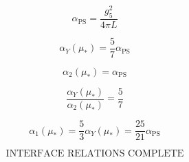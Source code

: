 \documentclass[11pt,a4paper]{article}
\theoremstyle{definition}
\begin{document}
\begin{equation}
\label{eq:add_24}
\alpha_{\text{PS}} = \frac{g_5^2}{4\pi L}
\end{equation}

\begin{equation}
\label{eq:add_25}
\alpha_Y(\mu_*) = \frac{5}{7}\alpha_{\text{PS}}
\end{equation}

\begin{equation}
\label{eq:add_26}
\alpha_2(\mu_*) = \alpha_{\text{PS}}
\end{equation}

\begin{equation}
\label{eq:add_27}
\frac{\alpha_Y(\mu_*)}{\alpha_2(\mu_*)} = \frac{5}{7}
\end{equation}

\begin{equation}
\label{eq:add_28}
\alpha_1(\mu_*) = \frac{5}{3}\alpha_Y(\mu_*) = \frac{25}{21}\alpha_{\text{PS}}
\end{equation}

\begin{equation}
\label{eq:add_final}
\text{INTERFACE RELATIONS COMPLETE}
\end{equation}
\end{document}
